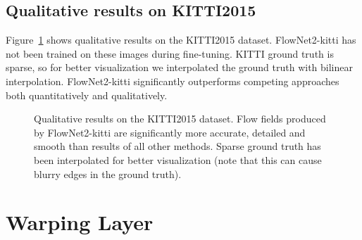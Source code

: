 \documentclass[10pt,twocolumn,letterpaper]{article}%
\begin{document}
\subsection{Qualitative results on KITTI2015} 

Figure~\ref{fig:gallery_kitti2015} shows qualitative results on the KITTI2015 dataset. 
FlowNet2-kitti has not been trained on these images during fine-tuning.
KITTI ground truth is sparse, so for better visualization we interpolated the ground truth with bilinear interpolation. 
FlowNet2-kitti significantly outperforms competing approaches both quantitatively and qualitatively.





\renewcommand{\galleryWidth}{0.165\linewidth}%

\begin{figure}[t]
  \begin{center}%
     
  \end{center}%
  \caption{Qualitative results on the KITTI2015 dataset. Flow fields produced by FlowNet2-kitti are significantly more accurate, detailed and smooth than results of all other methods. Sparse ground truth has been interpolated for better visualization (note that this can cause blurry edges in the ground truth).}%
  \label{fig:gallery_kitti2015}%
\end{figure}

%      

\section{Warping Layer}
\end{document}

